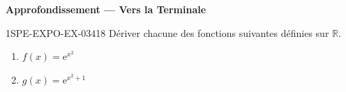 \begin{center}\textbf{Approfondissement — Vers la Terminale}\end{center}
\begin{exercice}{1SPE-EXPO-EX-034}{1}{8}
Dériver chacune des fonctions suivantes définies sur $\mathbb{R}$.
\begin{enumerate}
\item $f(x) = \mathrm{e}^{x^2}$
\item $g(x) = \mathrm{e}^{x^2+1}$
\end{enumerate}
\end{exercice}
